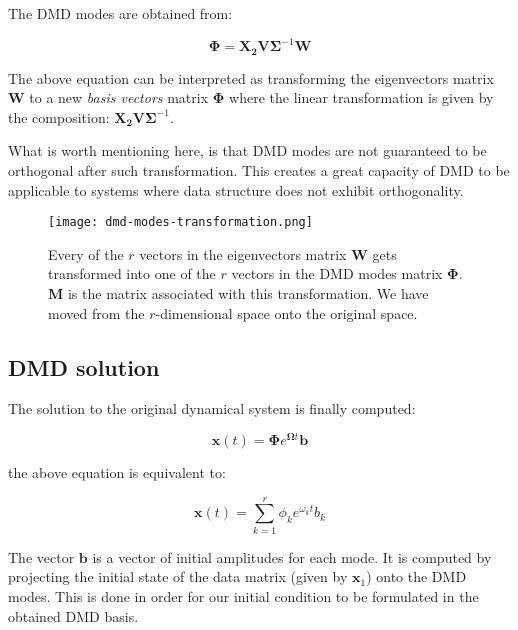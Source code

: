 \documentclass[10pt,twocolumn]{article}
\begin{document}
The DMD modes are obtained from:

\begin{equation} \label{eq:A_underline}
\mathbf{\Phi} = \mathbf{X_2} \mathbf{V} \mathbf{\Sigma}^{-1} \mathbf{W}
\end{equation}

The above equation can be interpreted as transforming the eigenvectors matrix $\mathbf{W}$ to a new \textit{basis vectors} matrix $\mathbf{\Phi}$ where the linear transformation is given by the composition: $\mathbf{X_2} \mathbf{V} \mathbf{\Sigma}^{-1}$.

What is worth mentioning here, is that DMD modes are not guaranteed to be orthogonal after such transformation. This creates a great capacity of DMD to be applicable to systems where data structure does not exhibit orthogonality.

\begin{figure}[H]
\centering\texttt{[image: dmd-modes-transformation.png]}
\caption{Every of the $r$ vectors in the eigenvectors matrix $\mathbf{W}$ gets transformed into one of the $r$ vectors in the DMD modes matrix $\mathbf{\Phi}$. $\mathbf{M}$ is the matrix associated with this transformation. We have moved from the $r$-dimensional space onto the original space.}
\label{fig:linear_system}
\end{figure}

\subsection{DMD solution}

The solution to the original dynamical system is finally computed:

\begin{equation} \label{eq:x-solution-matrix}
\mathbf{x}(t) = \mathbf{\Phi} e^{\mathbf{\Omega} t} \mathbf{b}
\end{equation}

the above equation is equivalent to:

\begin{equation} \label{eq:x-solution-summation}
\mathbf{x}(t)  = \sum_{k=1}^{r} \phi_k e^{\omega_k t} b_k
\end{equation}

The vector $\mathbf{b}$ is a vector of initial amplitudes for each mode. It is computed by projecting the initial state of the data matrix (given by $\mathbf{x}_1$) onto the DMD modes. This is done in order for our initial condition to be formulated in the obtained DMD basis.
\end{document}
